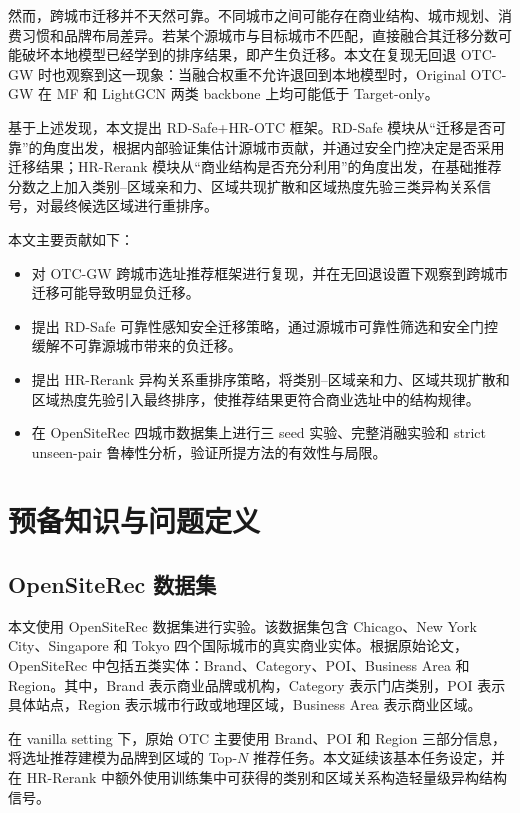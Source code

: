 \documentclass[10pt,twocolumn]{ctexart}
\begin{document}
然而，跨城市迁移并不天然可靠。不同城市之间可能存在商业结构、城市规划、消费习惯和品牌布局差异。若某个源城市与目标城市不匹配，直接融合其迁移分数可能破坏本地模型已经学到的排序结果，即产生负迁移。本文在复现无回退 OTC-GW 时也观察到这一现象：当融合权重不允许退回到本地模型时，Original OTC-GW 在 MF 和 LightGCN 两类 backbone 上均可能低于 Target-only。

基于上述发现，本文提出 RD-Safe+HR-OTC 框架。RD-Safe 模块从“迁移是否可靠”的角度出发，根据内部验证集估计源城市贡献，并通过安全门控决定是否采用迁移结果；HR-Rerank 模块从“商业结构是否充分利用”的角度出发，在基础推荐分数之上加入类别--区域亲和力、区域共现扩散和区域热度先验三类异构关系信号，对最终候选区域进行重排序。

本文主要贡献如下：
\begin{itemize}
  \item 对 OTC-GW 跨城市选址推荐框架进行复现，并在无回退设置下观察到跨城市迁移可能导致明显负迁移。
  \item 提出 RD-Safe 可靠性感知安全迁移策略，通过源城市可靠性筛选和安全门控缓解不可靠源城市带来的负迁移。
  \item 提出 HR-Rerank 异构关系重排序策略，将类别--区域亲和力、区域共现扩散和区域热度先验引入最终排序，使推荐结果更符合商业选址中的结构规律。
  \item 在 OpenSiteRec 四城市数据集上进行三 seed 实验、完整消融实验和 strict unseen-pair 鲁棒性分析，验证所提方法的有效性与局限。
\end{itemize}

\section{预备知识与问题定义}

\subsection{OpenSiteRec 数据集}

本文使用 OpenSiteRec 数据集进行实验。该数据集包含 Chicago、New York City、Singapore 和 Tokyo 四个国际城市的真实商业实体。根据原始论文，OpenSiteRec 中包括五类实体：Brand、Category、POI、Business Area 和 Region。其中，Brand 表示商业品牌或机构，Category 表示门店类别，POI 表示具体站点，Region 表示城市行政或地理区域，Business Area 表示商业区域。

在 vanilla setting 下，原始 OTC 主要使用 Brand、POI 和 Region 三部分信息，将选址推荐建模为品牌到区域的 Top-$N$ 推荐任务。本文延续该基本任务设定，并在 HR-Rerank 中额外使用训练集中可获得的类别和区域关系构造轻量级异构结构信号。
\end{document}
